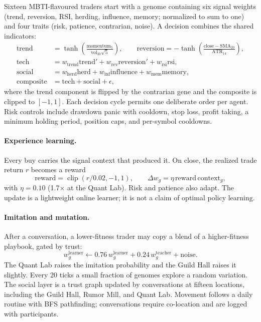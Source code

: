 \documentclass[11pt]{article}
\begin{document}
Sixteen MBTI-flavoured traders start with a genome containing six signal weights
(trend, reversion, RSI, herding, influence, memory; normalized to sum to one) and
four traits (risk, patience, contrarian, noise). A decision combines the shared
indicators:
\begin{align}
  \text{trend} &= \tanh\!\left(\frac{\text{momentum}_5}{\text{vol}_{20}\sqrt{5}}\right),
  \qquad
  \text{reversion} = -\tanh\!\left(\frac{\text{close}-\text{SMA}_{20}}{\text{ATR}_{14}}\right),\\
  \text{tech} &= w_{\text{trend}}\text{trend}' + w_{\text{rev}}\text{reversion}' + w_{\text{rsi}}\text{rsi},\\
  \text{social} &= w_{\text{herd}}\text{herd} + w_{\text{inf}}\text{influence}
  + w_{\text{mem}}\text{memory},\\
  \text{composite} &= \text{tech}+\text{social}+\epsilon,
\end{align}
where the trend component is flipped by the contrarian gene and the composite is
clipped to $[-1,1]$. Each decision cycle permits one deliberate order per agent.
Risk controls include drawdown panic with cooldown, stop loss, profit taking, a
minimum holding period, position caps, and per-symbol cooldowns.

\paragraph{Experience learning.}
Every buy carries the signal context that produced it. On close, the realized
trade return $r$ becomes a reward
\begin{equation}
  \text{reward}=\operatorname{clip}(r/0.02,-1,1),\qquad
  \Delta w_g=\eta\,\text{reward}\,\text{context}_g,
  \label{eq:learning}
\end{equation}
with $\eta=0.10$ (1.7$\times$ at the Quant Lab). Risk and patience also adapt.
The update is a lightweight online learner; it is not a claim of optimal policy
learning.

\paragraph{Imitation and mutation.}
After a conversation, a lower-fitness trader may copy a blend of a higher-fitness
playbook, gated by trust:
\begin{equation}
  w_g^{\text{learner}} \leftarrow 0.76\,w_g^{\text{learner}}
  + 0.24\,w_g^{\text{teacher}} + \text{noise}.
  \label{eq:imitation}
\end{equation}
The Quant Lab raises the imitation probability and the Guild Hall raises it
slightly. Every 20 ticks a small fraction of genomes explore a random variation.
The social layer is a trust graph updated by conversations at fifteen locations,
including the Guild Hall, Rumor Mill, and Quant Lab. Movement follows a daily
routine with BFS pathfinding; conversations require co-location and are logged
with participants.
\end{document}
